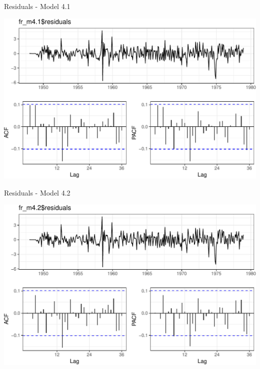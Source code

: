 \documentclass[11pt,ignorenonframetext,]{beamer}
\begin{document}
\begin{frame}{%
\protect\hypertarget{residuals---model-4.1}{%
Residuals - Model 4.1}}

\begin{center}\includegraphics[width=\textwidth]{Lec11_files/figure-beamer/unnamed-chunk-26-1} \end{center}

\end{frame}

\begin{frame}{%
\protect\hypertarget{residuals---model-4.2}{%
Residuals - Model 4.2}}

\begin{center}\includegraphics[width=\textwidth]{Lec11_files/figure-beamer/unnamed-chunk-27-1} \end{center}

\end{frame}
\end{document}
